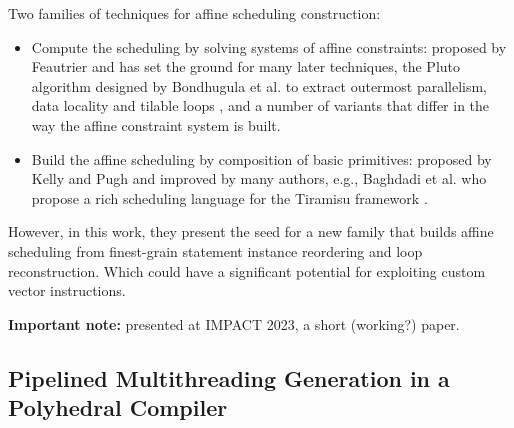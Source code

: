 Two families of techniques for affine scheduling construction:
\begin{itemize}
    \item Compute the scheduling by solving systems of affine constraints: proposed by Feautrier \cite{feautrier1992some} and has set the ground for many later techniques, the Pluto algorithm designed by Bondhugula et al. to extract outermost parallelism, data locality and tilable loops \cite{bondhugula2008practical}, and a number of variants that differ in the way the affine constraint system is built.
    \item Build the affine scheduling by composition of basic primitives: proposed by Kelly and Pugh \cite{kelly1998framework} and improved by many authors, e.g., Baghdadi et al. who propose a rich scheduling language for the Tiramisu framework \cite{baghdadi2019tiramisu}. 
\end{itemize}
However, in this work, they present the seed for a new family that builds affine scheduling from finest-grain statement instance reordering and loop reconstruction. Which could have a significant potential for exploiting custom vector instructions.

\textbf{Important note:} presented at IMPACT 2023, a short (working?) paper.

\subsection{Pipelined Multithreading Generation in a Polyhedral Compiler}

